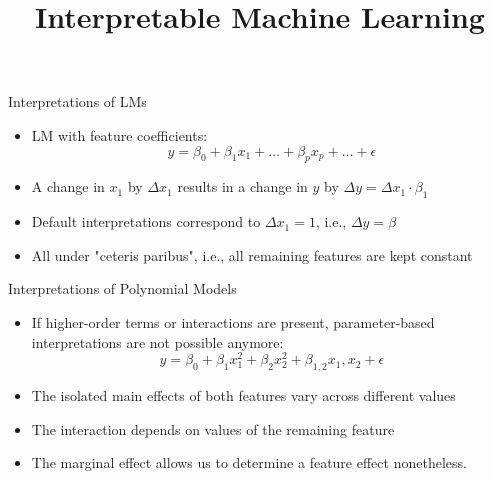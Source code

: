 \documentclass[11pt,compress,t,notes=noshow, aspectratio=169, xcolor=table]{beamer}
\title{Interpretable Machine Learning}
\date{}
\begin{document}
\newcommand{\titlefigure}{figure_man/me_movement}
\newcommand{\learninggoals}{
\item Why parameter-based interpretations are not always possible for parametric models
\item How marginal effects can be used in such cases
\item Drawbacks of marginal effects
\item Model-agnostic applicability}


\begin{frame}{Interpretations of LMs}

\begin{itemize}
\itemsep1em
\item LM with feature coefficients:
\begin{equation*}
y = \beta_0 + \beta_1 x_1 + \dots + \beta_p x_p + \dots + \epsilon
\end{equation*}
\item A change in $x_1$ by $\Delta x_1$ results in a change in $y$ by $\Delta y = \Delta x_1 \cdot \beta_1$
\item Default interpretations correspond to $\Delta x_1 = 1$, i.e., $\Delta y = \beta$
\item All under "ceteris paribus", i.e., all remaining features are kept constant
\end{itemize}
\end{frame}

\begin{frame}{Interpretations of Polynomial Models}


\begin{itemize}
\itemsep1em
\item If higher-order terms or interactions are present, parameter-based interpretations are not possible anymore:
\begin{equation}
y = \beta_0 + \beta_{1} x_1^2 + \beta_{2} x_2^2 + \beta_{1, 2} x_1, x_2 + \epsilon
\label{eq:poly_model}
\end{equation}
\item The isolated main effects of both features vary across different values
\item The interaction depends on values of the remaining feature
\item The marginal effect allows us to determine a feature effect nonetheless.
\end{itemize}

\end{frame}
\end{document}
